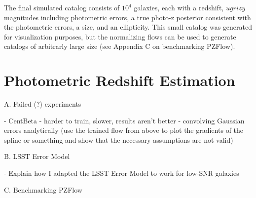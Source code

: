 \documentclass[twocolumn]{aastex631}
\begin{document}
The final simulated catalog consists of $10^4$ galaxies, each with a redshift, $ugrizy$ magnitudes including photometric errors, a true photo-z posterior consistent with the photometric errors, a size, and an ellipticity.
This small catalog was generated for visualization purposes, but the normalizing flows can be used to generate catalogs of arbitrarly large size (see Appendix C on benchmarking PZFlow).


\section{Photometric Redshift Estimation}
\label{sec:photo-z}

\appendix
A. Failed (?) experiments

- CentBeta - harder to train, slower, results aren't better
- convolving Gaussian errors analytically (use the trained flow from above to plot the gradients of the spline or something and show that the necessary assumptions are not valid)

B. LSST Error Model

- Explain how I adapted the LSST Error Model to work for low-SNR galaxies

C. Benchmarking PZFlow



\end{document}
